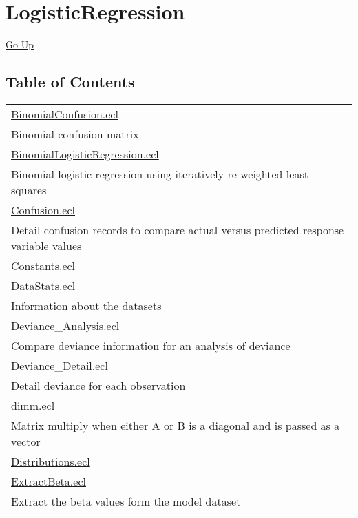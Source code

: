 \chapter*{\color{headtoc} LogisticRegression}
\hypertarget{ecldoc:toc:root/LogisticRegression}{}
\hyperlink{ecldoc:toc:root}{Go Up}


\section*{Table of Contents}
{\renewcommand{\arraystretch}{1.5}
\begin{longtable}{|p{\textwidth}|}
\hline
\hyperlink{ecldoc:toc:LogisticRegression.BinomialConfusion}{BinomialConfusion.ecl} \\
Binomial confusion matrix \\
\hline
\hyperlink{ecldoc:toc:LogisticRegression.BinomialLogisticRegression}{BinomialLogisticRegression.ecl} \\
Binomial logistic regression using iteratively re-weighted least squares \\
\hline
\hyperlink{ecldoc:toc:LogisticRegression.Confusion}{Confusion.ecl} \\
Detail confusion records to compare actual versus predicted response variable values \\
\hline
\hyperlink{ecldoc:toc:LogisticRegression.Constants}{Constants.ecl} \\
\hline
\hyperlink{ecldoc:toc:LogisticRegression.DataStats}{DataStats.ecl} \\
Information about the datasets \\
\hline
\hyperlink{ecldoc:toc:LogisticRegression.Deviance_Analysis}{Deviance\_Analysis.ecl} \\
Compare deviance information for an analysis of deviance \\
\hline
\hyperlink{ecldoc:toc:LogisticRegression.Deviance_Detail}{Deviance\_Detail.ecl} \\
Detail deviance for each observation \\
\hline
\hyperlink{ecldoc:toc:LogisticRegression.dimm}{dimm.ecl} \\
Matrix multiply when either A or B is a diagonal and is passed as a vector \\
\hline
\hyperlink{ecldoc:toc:LogisticRegression.Distributions}{Distributions.ecl} \\
\hline
\hyperlink{ecldoc:toc:LogisticRegression.ExtractBeta}{ExtractBeta.ecl} \\
Extract the beta values form the model dataset \\

\end{longtable}}
